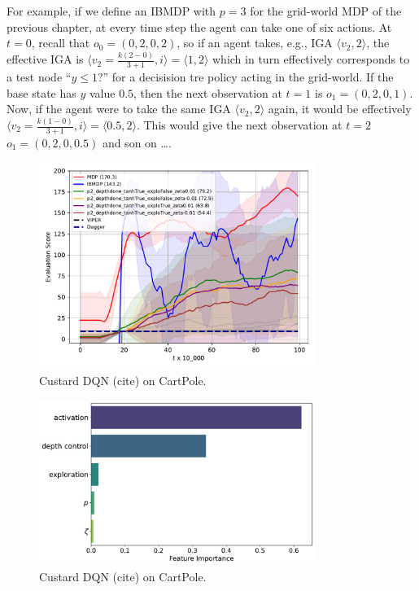 For example, if we define an IBMDP with $p=3$ for the grid-world MDP of the previous chapter, at every time step the agent can take one of six actions. 
At $t=0$, recall that $o_0=(0, 2, 0, 2)$, so if an agent takes, e.g., IGA $\langle v_2, 2 \rangle$, the effective IGA is $\langle v_2=\frac{k(2-0)}{3+1}, i \rangle = \langle 1, 2 \rangle$ which in turn effectively corresponds to a test node ``$y \leq 1$?'' for a decisision tre policy acting in the grid-world.
If the base state has $y$ value $0.5$, then the next observation at $t=1$ is $o_1=(0, 2, 0, 1)$. Now, if the agent were to take the same IGA $\langle v_2, 2 \rangle$ again, it would be effectively $\langle v_2=\frac{k(1-0)}{3+1}, i \rangle = \langle 0.5, 2 \rangle$. 
This would give the next observation at $t=2$ $o_1=(0, 2, 0, 0.5)$ and son on \dots. 


\begin{figure}
    \centering
    \includegraphics[width=0.8\textwidth]{images/images_part1/dqn.pdf}
    \caption{Custard DQN (cite) on CartPole.}
\end{figure}

\begin{figure}
    \centering
    \includegraphics[width=0.8\textwidth]{images/images_part1/hyperparameter_importance_dqn.pdf}
    \caption{Custard DQN (cite) on CartPole.}
\end{figure}

